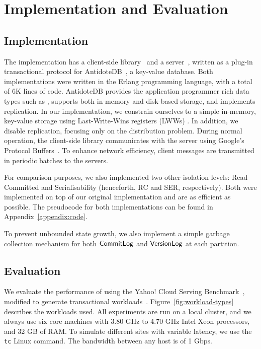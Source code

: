 \cleardoublepage
\chapter{Implementation and Evaluation}
\label{eval_chapter}

\section{Implementation}

The  implementation has a client-side library~\citep{pvc-client} and a server~\citep{pvc-server}, written as a plug-in transactional protocol for AntidoteDB~\citep{antidote-db}, a key-value database. Both implementations were written in the Erlang programming language, with a total of 6K lines of code. AntidoteDB provides the application programmer rich data types such as , supports both in-memory and disk-based storage, and implements  replication. In our implementation, we constrain ourselves to a simple in-memory, key-value storage using Last-Write-Wins registers (LWWs) . In addition, we disable replication, focusing only on the distribution problem. During normal operation, the client-side library communicates with the server using Google's Protocol Buffers~\citep{protobuf}. To enhance network efficiency, client messages are transmitted in periodic batches to the servers.


For comparison purposes, we also implemented two other isolation levels: Read Committed and Serialisability (henceforth, RC and SER, respectively). Both were implemented on top of our original implementation and are as efficient as possible. The pseudocode for both implementations can be found in Appendix~\ref{appendix:code}.

To prevent unbounded state growth, we also implement a simple garbage collection mechanism for both $\mathsf{CommitLog}$ and $\mathsf{VersionLog}$ at each partition.

\section{Evaluation}

We evaluate the performance of  using the Yahoo! Cloud Serving Benchmark~\citep{ycsb}, modified to generate transactional workloads~\citep{ardekani-nsmi}. Figure~\ref{fig:workload-types} describes the workloads used. All experiments are run on a local cluster, and we always use six core machines with 3.80 GHz to 4.70 GHz Intel Xeon processors, and 32 GB of RAM. To simulate different sites with variable latency, we use the \texttt{tc} Linux command. The bandwidth between any host is of 1 Gbps.

